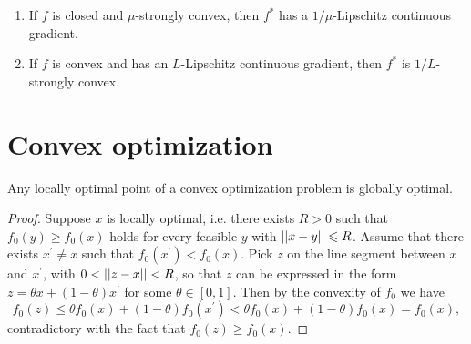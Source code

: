 \documentclass[12pt]{article}
\begin{document}
\begin{theorem}
    \begin{enumerate}
        \item If \(f\) is closed and \(\mu\)-strongly convex, then \(f^\ast\) has a \(1/\mu\)-Lipschitz continuous gradient.
        \item If \(f\) is convex and has an \(L\)-Lipschitz continuous gradient, then \(f^\ast\) is \(1/L\)-strongly convex.
    \end{enumerate}
\end{theorem}

\section{Convex optimization}

\begin{theorem}
    Any locally optimal point of a convex optimization problem is globally optimal.
\end{theorem}
\begin{proof}
    Suppose \(x\) is locally optimal, i.e. there exists \(R>0\) such that \(f_0(y)\geqslant f_0(x)\) holds for every feasible \(y\) with \(\left|\left|x-y\right|\right|\leqslant R\). Assume that there exists \(x^\prime\neq x\) such that \(f_0(x^\prime)<f_0(x)\). Pick \(z\) on the line segment between \(x\) and \(x^\prime\), with \(0<\left|\left|z-x\right|\right|<R\), so that \(z\) can be expressed in the form \(z=\theta x+(1-\theta)x^\prime\) for some \(\theta\in[0,1]\). Then by the convexity of \(f_0\) we have
    \[f_0(z)\leqslant\theta f_0(x)+(1-\theta)f_0(x^\prime)<\theta f_0(x)+(1-\theta)f_0(x)=f_0(x),\]
    contradictory with the fact that \(f_0(z)\geqslant f_0(x)\).
\end{proof}




\end{document}
